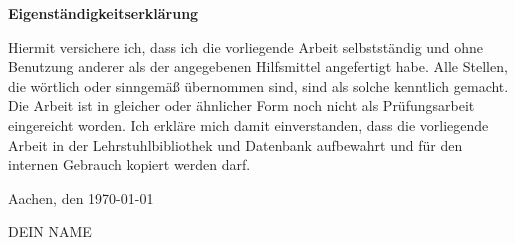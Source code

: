 \Large
\textbf{Eigenständigkeitserklärung}

\normalsize
Hiermit versichere ich, dass ich die vorliegende Arbeit selbstständig und ohne Benutzung anderer als der angegebenen Hilfsmittel angefertigt habe. Alle Stellen, die wörtlich oder sinngemäß übernommen sind, sind als solche kenntlich gemacht. Die Arbeit ist in gleicher oder ähnlicher Form noch nicht als Prüfungsarbeit eingereicht worden. Ich erkläre mich damit einverstanden, dass die vorliegende Arbeit in der Lehrstuhlbibliothek und Datenbank aufbewahrt und für den internen Gebrauch kopiert werden darf. \newline \newline


Aachen, den \today \newline \newline

DEIN NAME
